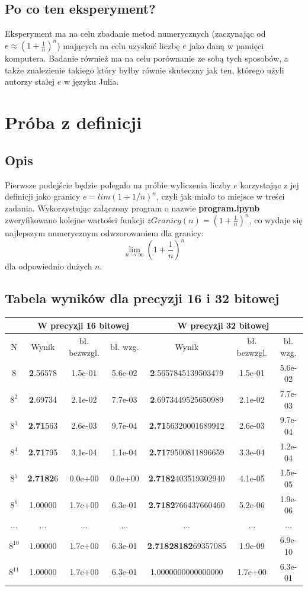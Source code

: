 \documentclass{article}
\begin{document}
\subsection{Po co ten eksperyment?}
Eksperyment ma na celu zbadanie metod numerycznych (zaczynając od $e \approx (1+\frac{1}{n})^{n}$) mających na celu uzyskać liczbę $e$ jako daną w pamięci komputera. Badanie również ma na celu porównanie ze sobą tych sposobów, a także znalezienie takiego który byłby równie skuteczny jak ten, którego użyli autorzy stałej $e$ w języku Julia.

\newpage

\section{Próba z definicji}
\subsection{Opis}
Pierwsze podejście będzie polegało na próbie wyliczenia liczby $e$ korzystając z jej definicji jako granicy $e=lim{(1+1/n)^n}$, czyli jak miało to miejsce w treści zadania.
Wykorzystując załączony program o nazwie \textbf{program.ipynb} zweryfikowano kolejne wartości funkcji $zGranicy(n) = (1+\frac{1}{n})^{n}$, co wydaje się najlepszym numerycznym odwzorowaniem dla granicy: \[ \lim_{n \to \infty}(1+\frac{1}{n})^{n}\]
dla odpowiednio dużych $n$. 
\subsection{Tabela wyników dla precyzji 16 i 32 bitowej}
\begin{tabular}{||c||c|c|c|c|c|c|} \hline
 & \multicolumn{3}{|c}{W precyzji 16 bitowej} & \multicolumn{3}{|c|}{W precyzji 32 bitowej} \\ \hline
N & Wynik & bł. bezwzgl. & bł. wzg. & Wynik & bł. bezwzgl. & bł. wzg.\\ \hline
8 & \textbf{2}.56578 & 1.5e-01  & 5.6e-02 & \textbf{2}.5657845139503479  & 1.5e-01  & 5.6e-02\\
\hline
$8^2$ &  \textbf{2}.69734  & 2.1e-02  & 7.7e-03 &  \textbf{2}.6973449525650989  & 2.1e-02  & 7.7e-03\\
\hline
$8^3$ & \textbf{2.71}563  & 2.6e-03  & 9.7e-04 & \textbf{2.71}56320001689912  & 2.6e-03  & 9.7e-04\\
\hline
$8^4$ & \textbf{2.71}795 & 3.1e-04  & 1.1e-04 &  \textbf{2.71}79500811896659  & 3.3e-04 & 1.2e-04\\
\hline
$8^5$ & \textbf{2.7182}6  & 0.0e+00  & 0.0e+00 &  \textbf{2.7182}403519302940  & 4.1e-05 & 1.5e-05\\
\hline
$8^6$ & 1.00000 & 1.7e+00  & 6.3e-01 &  \textbf{2.7182}766437660460  & 5.2e-06 & 1.9e-06\\
\hline
... & ... & ...  & ... & ... & ... & ...\\
\hline
$8^{10}$ & 1.00000 & 1.7e+00  & 6.3e-01 & \textbf{2.71828182}69357085  & 1.9e-09  & 6.9e-10\\
\hline
$8^{11}$ & 1.00000 & 1.7e+00  & 6.3e-01 & 1.0000000000000000  & 1.7e+00  & 6.3e-01 \\
\hline
\end{tabular}
\end{document}
